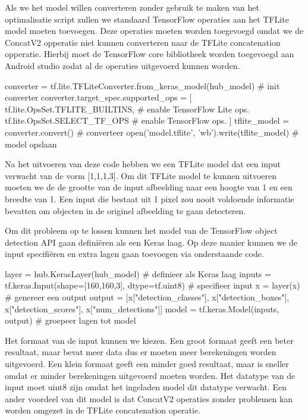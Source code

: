 Als we het model willen converteren zonder gebruik te maken van het optimalisatie script zullen we standaard TensorFlow operaties aan het TFLite model moeten toevoegen.
Deze operaties moeten worden toegevoegd omdat we de ConcatV2 opperatie niet kunnen converteren naar de TFLite concatenation opperatie.
Hierbij moet de TensorFlow core bibliotheek worden toegevoegd aan Android studio zodat al de operaties uitgevoerd kunnen worden.

\begin{python}
converter = tf.lite.TFLiteConverter.from_keras_model(hub_model) # init converter
converter.target_spec.supported_ops = [
    tf.lite.OpsSet.TFLITE_BUILTINS, # enable TensorFlow Lite ops.
    tf.lite.OpsSet.SELECT_TF_OPS # enable TensorFlow ops.
]
tflite_model = converter.convert() # converteer
open('model.tflite', 'wb').write(tflite_model) # model opslaan
\end{python}

Na het uitvoeren van deze code hebben we een TFLite model dat een input verwacht van de vorm [1,1,1,3].
Om dit TFLite model te kunnen uitvoeren moeten we de de grootte van de input afbeelding naar een hoogte van 1 en een breedte van 1.
Een input die bestaat uit 1 pixel zou nooit voldoende informatie bevatten om objecten in de originel afbeelding te gaan detecteren.

Om dit probleem op te lossen kunnen het model van de TensorFlow object detection API gaan defini\"eren als een Keras laag.
Op deze manier kunnen we de input specifi\"eren en extra lagen gaan toevoegen via onderstaande code.

\begin{python}
layer = hub.KerasLayer(hub_model) # definieer als Keras laag
inputs = tf.keras.Input(shape=[160,160,3], dtype=tf.uint8) # specifieer input
x = layer(x) # genereer een output
output = [x["detection_classes"], x["detection_boxes"], x["detection_scores"], x["num_detections"]]
model = tf.keras.Model(inputs, output) # groepeer lagen tot model
\end{python}

Het formaat van de input kunnen we kiezen.
Een groot formaat geeft een beter resultaat, maar bevat meer data dus er moeten meer berekeningen worden uitgevoerd.
Een klein formaat geeft een minder goed resultaat, maar is sneller omdat er minder berekeningen uitgevoerd moeten worden.
Het datatype van de input moet uint8 zijn omdat het ingeladen model dit datatype verwacht.
Een ander voordeel van dit model is dat ConcatV2 operaties zonder problemen kan worden omgezet in de TFLite concatenation operatie.

